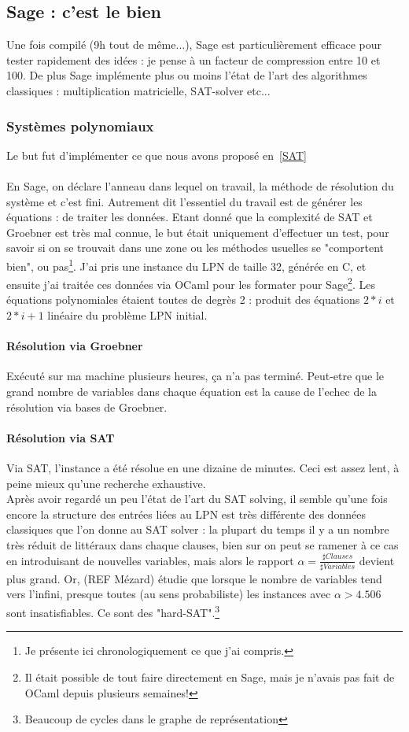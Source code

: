 \documentclass{article}		%
\begin{document}
\subsection{Sage : c'est le bien}
Une fois compilé (9h tout de même...), Sage est particulièrement efficace
pour tester rapidement des idées : je pense à un facteur de compression
entre 10 et 100. De plus Sage
implémente plus ou moins l'état de l'art des algorithmes classiques : multiplication
matricielle, SAT-solver etc...  


\subsubsection{Systèmes polynomiaux}
Le but fut d'implémenter ce que nous avons proposé en~\ref{SAT}
\\\\
En Sage, on déclare l'anneau dans lequel on travail, la méthode de
résolution du système et c'est fini. Autrement dit l'essentiel du travail
est de générer les équations : de traiter les données. Etant donné que la
complexité de SAT et Groebner est très mal connue, le but était
uniquement d'effectuer un test, pour savoir si on se trouvait dans une
zone ou les méthodes usuelles se "comportent bien", ou pas\footnote{Je
présente ici chronologiquement ce que j'ai compris.}.
J'ai pris une instance du LPN de taille 32, générée en C, et ensuite j'ai
traitée ces données via OCaml pour les formater pour Sage\footnote{Il
était possible de tout faire directement en Sage, mais je n'avais pas
fait de OCaml depuis plusieurs semaines!}. Les équations polynomiales
étaient toutes de degrès 2 : produit des équations $2*i$ et $2*i+1$
linéaire du problème LPN initial.
\paragraph{Résolution via Groebner}
Exécuté sur ma machine plusieurs heures, ça n'a pas terminé. Peut-etre 
que le grand nombre de variables dans chaque équation est la cause de
l'echec de la résolution via
bases de Groebner.
\paragraph{Résolution via SAT}
Via SAT, l'instance a été résolue en une dizaine de minutes. Ceci est
assez lent, à peine mieux qu'une recherche exhaustive. 
\\
Après avoir regardé
un peu l'état de l'art du SAT solving, il semble qu'une fois encore la
structure des entrées liées au LPN est très différente des données
classiques que l'on donne au SAT solver : la plupart du temps il y a un
nombre très réduit de littéraux dans chaque clauses, bien sur on peut se
ramener à ce cas en introduisant de nouvelles variables, mais alors le
rapport $\alpha=\frac {\sharp Clauses}{\sharp Variables}$ devient plus grand.
Or, (REF Mézard) étudie que lorsque le nombre de variables tend vers
l'infini, presque toutes (au sens probabiliste) les
instances avec $\alpha > 4.506$ sont insatisfiables. Ce sont des
"hard-SAT".\footnote{Beaucoup de cycles dans le graphe de représentation}
\end{document}
